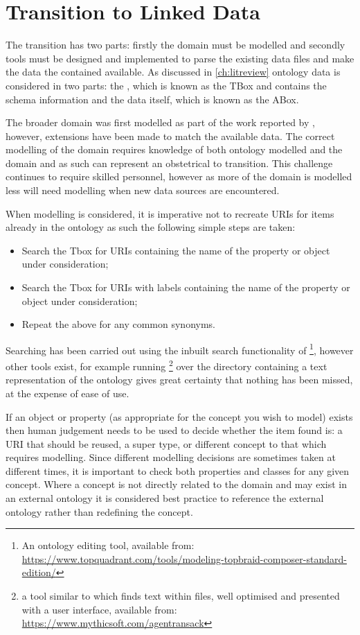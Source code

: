 \section{Transition to Linked Data}
The transition has two parts: firstly the domain must be modelled and secondly tools must be designed and implemented to parse the existing data files and make the data the contained available. As discussed in \autoref{ch:litreview} ontology data is considered in two parts: the , which is known as the TBox and contains the schema information and the data itself, which is known as the ABox. 

The broader domain was first modelled as part of the work reported by \citet{Tutcher2015}, however, extensions have been made to match the available data. The correct modelling of the domain requires knowledge of both ontology modelled and the domain and as such can represent an obstetrical to transition. This challenge continues to require skilled personnel, however as more of the domain is modelled less will need modelling when new data sources are encountered. 

When modelling is considered, it is imperative not to recreate URIs for items already in the ontology as such the following simple steps are taken:
 \begin{itemize}
	\item Search the Tbox for URIs containing the name of the property or object under consideration;
	\item Search the Tbox for URIs with labels containing the name of the property or object under consideration;
	\item Repeat the above for any common synonyms.
\end{itemize}

Searching has been carried out using the inbuilt search functionality of \footnote{An ontology editing tool, available from: \url{https://www.topquadrant.com/tools/modeling-topbraid-composer-standard-edition/}}, however other tools exist, for example running \footnote{a tool similar to  which finds text within files, well optimised and presented with a user interface, available from: \url{https://www.mythicsoft.com/agentransack}} over the directory containing a text representation of the ontology gives great certainty that nothing has been missed, at the expense of ease of use.

If an object or property (as appropriate for the concept you wish to model) exists then human judgement needs to be used to decide whether the item found is: a URI that should be reused, a super type, or different concept to that which requires modelling. Since different modelling decisions are sometimes taken at different times, it is important to check both properties and classes for any given concept. Where a concept is not directly related to the domain and may exist in an external ontology it is considered best practice to reference the external ontology rather than redefining the concept.

